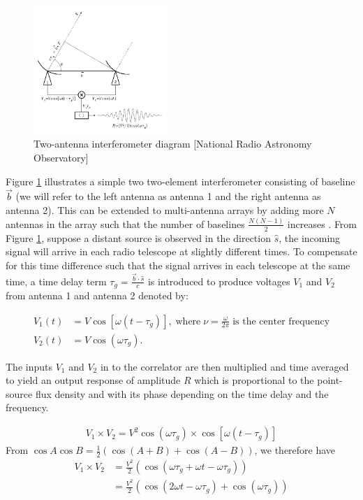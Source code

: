 \begin{figure}[h!]
  \centering
    \includegraphics[width=0.45\textwidth]{images/Rint.png}
    \caption{Two-antenna interferometer diagram [National Radio Astronomy Observatory]}
  \label{images/Rint.png}
\end{figure}

Figure \ref{images/Rint.png} illustrates a simple two two-element interferometer consisting of baseline $\overrightarrow{b}$ (we will refer to the left antenna as antenna 1 and the right antenna as antenna 2). This can be extended to multi-antenna arrays by adding more $N$ antennas in the array such that the number of baselines  $\frac{N(N-1)}{2}$  increases \citep{thompson2001interferometry}. From Figure \ref{images/Rint.png}, suppose a distant source is observed in the direction $\widehat{s}$, the incoming signal will arrive in each radio telescope at slightly  different times. To compensate for this time difference such that the signal arrives in each telescope at the same time, a time delay term $\tau_{g}=\frac{\overrightarrow{b}\cdot\widehat{s}}{c}$ is introduced to produce voltages $V_1$ and $V_2$ from antenna 1 and antenna 2 denoted by: 

\begin{equation}\label{eq111}
\begin{split}
V_1(t)&=V\cos[\omega(t-\tau_{g})],\; \text{where} \;\nu=\frac{\omega}{2\pi}\; \text{is the center frequency} \\
V_2(t)&=V\cos(\omega\tau_{g}).
\end{split}
\end{equation}

The inputs $V_1$ and $V_2$ in to the correlator are then  multiplied and time averaged to yield an output response of  amplitude $R$ which is proportional to the point-source flux density and with its phase depending on the time delay and the frequency.

\begin{align}
V_1 \times V_2 = V^2 \cos(\omega\tau_{g})\times \cos[\omega(t-\tau_{g})]
\end{align}
From $\cos A\cos B= \frac{1}{2} \left(\cos (A+B) + \cos (A-B) \right)$, 
we therefore have 
\begin{align*}
V_1 \times V_2&= \frac{V^2}{2} \left( \cos(\omega\tau_{g} + \omega t-\omega \tau_{g} )\right)\\
&= \frac{V^2}{2} \left(\cos(2\omega t - \omega \tau_{g}) + \cos (\omega\tau_{g})\right)
\end{align*}

